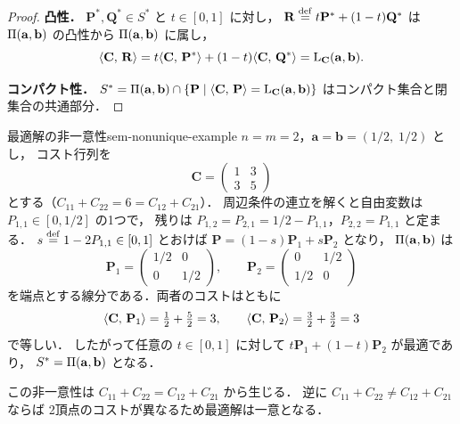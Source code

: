 \begin{proof}
  \textbf{凸性．}
  $\mathbf{P}^*, \mathbf{Q}^* \in S^*$ と $t \in [0,1]$ に対し，
  $\mathbf{R} \overset{\mathrm{def}}{=} t\mathbf{P}^* + (1-t)\mathbf{Q}^*$ は
  $\Pi(\mathbf{a}, \mathbf{b})$ の凸性から
  $\Pi(\mathbf{a}, \mathbf{b})$ に属し，
  \[
    \langle \mathbf{C},\, \mathbf{R} \rangle
    = t\langle \mathbf{C},\, \mathbf{P}^* \rangle + (1-t)\langle \mathbf{C},\, \mathbf{Q}^* \rangle
    = \mathrm{L}_{\mathbf{C}}(\mathbf{a}, \mathbf{b}).
  \]

  \textbf{コンパクト性．}
  $S^*
  = \Pi(\mathbf{a}, \mathbf{b})
  \cap \{\mathbf{P} \mid \langle \mathbf{C},\, \mathbf{P} \rangle
  = \mathrm{L}_{\mathbf{C}}(\mathbf{a}, \mathbf{b})\}$
  はコンパクト集合と閉集合の共通部分．
\end{proof}

\begin{example}{最適解の非一意性}{sem-nonunique-example}
  $n = m = 2$，$\mathbf{a} = \mathbf{b} = (1/2,\; 1/2)$ とし，
  コスト行列を
  \[
    \mathbf{C} = \begin{pmatrix} 1 & 3 \\ 3 & 5 \end{pmatrix}
  \]
  とする（$C_{11} + C_{22} = 6 = C_{12} + C_{21}$）．
  周辺条件の連立を解くと自由変数は $P_{1,1} \in [0,1/2]$ の1つで，
  残りは $P_{1,2} = P_{2,1} = 1/2 - P_{1,1}$，$P_{2,2} = P_{1,1}$ と定まる．
  $s \overset{\mathrm{def}}{=} 1 - 2P_{1,1} \in [0,1]$ とおけば $\mathbf{P} = (1-s)\mathbf{P}_1 + s\mathbf{P}_2$ となり，
  $\Pi(\mathbf{a}, \mathbf{b})$ は
  \[
    \mathbf{P}_1
    = \begin{pmatrix} 1/2 & 0 \\ 0 & 1/2 \end{pmatrix},
    \qquad
    \mathbf{P}_2
    = \begin{pmatrix} 0 & 1/2 \\ 1/2 & 0 \end{pmatrix}
  \]
  を端点とする線分である．両者のコストはともに
  \[
    \langle \mathbf{C},\, \mathbf{P}_1 \rangle
    = \tfrac{1}{2} + \tfrac{5}{2} = 3,
    \qquad
    \langle \mathbf{C},\, \mathbf{P}_2 \rangle
    = \tfrac{3}{2} + \tfrac{3}{2} = 3
  \]
  で等しい．
  したがって任意の $t \in [0, 1]$ に対して
  $t\mathbf{P}_1 + (1-t)\mathbf{P}_2$ が最適であり，
  $S^* = \Pi(\mathbf{a}, \mathbf{b})$ となる．

  この非一意性は
  $C_{11} + C_{22} = C_{12} + C_{21}$ から生じる．
  逆に $C_{11} + C_{22} \neq C_{12} + C_{21}$ ならば
  2頂点のコストが異なるため最適解は一意となる．
\end{example}

